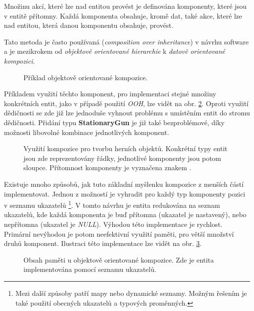 Množinu akcí, které lze nad entitou provést je definována komponenty, které jsou v entitě přítomny. Každá komponenta obsahuje, kromě dat, také akce, které lze nad entitou, která danou komponentu obsahuje, provést.

Tato metoda je často používaná (\emph{composition over inheritance}) v návrhu software a je mezikrokem od \emph{objektově orientované hierarchie} k \emph{datově orientované kompozici}. 

\begin{figure}
	\caption{Příklad objektově orientované kompozice.}
	\label{Fig:OOCHierarchy}
\end{figure}

Příkladem využití těchto komponent, pro implementaci stejné množiny konkrétních entit, jako v případě použití \emph{OOH}, lze vidět na obr. \ref{Fig:OOCEntity}. Oproti využití dědičnosti se zde již lze jednoduše vyhnout problému s umístěním entit do stromu dědičnosti. Přidání typu \textbf{StationaryGun} je již také bezproblémové, díky možnosti libovolné kombinace jednotlivých komponent.

\begin{figure}
	\caption{Využití kompozice pro tvorbu herních objektů. Konkrétní typy entit jsou zde reprezentovány řádky, jednotlivé komponenty jsou potom sloupce. Přítomnost komponenty je vyznačena znakem .}
	\label{Fig:OOCEntity}
\end{figure}

Existuje mnoho způsobů, jak tuto základní myšlenku kompozice z menších částí implementovat. Jednou z možností je vyhradit pro každý typ komponenty pozici v seznamu ukazatelů \footnote{Mezi další způsoby patří mapy nebo dynamické seznamy. Možným řešením je také použití obecných ukazatelů a typových proměnných. }. V tomto návrhu je entita redukována na seznam ukazatelů, kde každá komponenta je buď přítomna (ukazatel je nastavený), nebo nepřítomna (ukazatel je \emph{NULL}). Výhodou této implementace je rychlost. Primární nevýhodou je potom neefektivní využití paměti, pro větší množství druhů komponent. Ilustraci této implementace lze vidět na obr. \ref{Fig:OOCImpl}. 

\begin{figure}
	\caption{Obsah paměti u objektově orientované kompozice. Zde je entita implementována pomocí seznamu ukazatelů.}
	\label{Fig:OOCImpl}
\end{figure}

